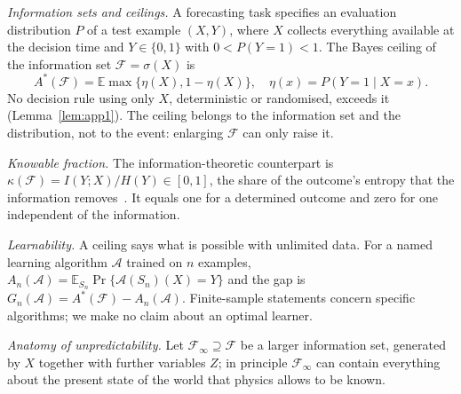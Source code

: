 \documentclass[journal]{IEEEtran}
\theoremstyle{definition}
\newcommand{\E}{\mathbb{E}}
\newcommand{\F}{\mathcal{F}}
\begin{document}
\emph{Information sets and ceilings.} A forecasting task specifies an evaluation distribution $P$ of a test example $(X,Y)$, where $X$ collects everything available at the decision time and $Y\in\{0,1\}$ with $0<P(Y=1)<1$. The Bayes ceiling of the information set $\F=\sigma(X)$ is
\begin{equation}
A^*(\F)=\E\max\{\eta(X),1-\eta(X)\},\quad \eta(x)=P(Y=1\mid X=x).
\end{equation}
No decision rule using only $X$, deterministic or randomised, exceeds it (Lemma~\ref{lem:app1}). The ceiling belongs to the information set and the distribution, not to the event: enlarging $\F$ can only raise it.

\emph{Knowable fraction.} The information-theoretic counterpart is $\kappa(\F)=I(Y;X)/H(Y)\in[0,1]$, the share of the outcome's entropy that the information removes~\cite{theil1970estimation}. It equals one for a determined outcome and zero for one independent of the information.

\emph{Learnability.} A ceiling says what is possible with unlimited data. For a named learning algorithm $\mathcal A$ trained on $n$ examples, $A_n(\mathcal A)=\E_{S_n}\Pr\{\mathcal A(S_n)(X)=Y\}$ and the gap is $G_n(\mathcal A)=A^*(\F)-A_n(\mathcal A)$. Finite-sample statements concern specific algorithms; we make no claim about an optimal learner.

\emph{Anatomy of unpredictability.} Let $\F_\infty\supseteq\F$ be a larger information set, generated by $X$ together with further variables $Z$; in principle $\F_\infty$ can contain everything about the present state of the world that physics allows to be known.
\end{document}
